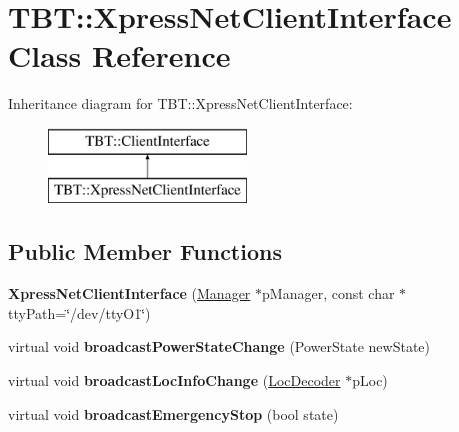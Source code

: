 \hypertarget{classTBT_1_1XpressNetClientInterface}{}\section{T\+BT\+:\+:Xpress\+Net\+Client\+Interface Class Reference}
\label{classTBT_1_1XpressNetClientInterface}
Inheritance diagram for T\+BT\+:\+:Xpress\+Net\+Client\+Interface\+:\begin{figure}[H]
\begin{center}
\leavevmode
\includegraphics[height=2.000000cm]{classTBT_1_1XpressNetClientInterface}
\end{center}
\end{figure}
\subsection*{Public Member Functions}
\begin{DoxyCompactItemize}
\item 
\mbox{\label{classTBT_1_1XpressNetClientInterface_afc3950ffc2b045e653c539a57967aa57}} 
{\bfseries Xpress\+Net\+Client\+Interface} (\hyperlink{classTBT_1_1Manager}{Manager} $\ast$p\+Manager, const char $\ast$tty\+Path=\char`\"{}/dev/tty\+O1\char`\"{})
\item 
\mbox{\label{classTBT_1_1XpressNetClientInterface_a174a6a686771c61ebaf52be9f39fc075}} 
virtual void {\bfseries broadcast\+Power\+State\+Change} (Power\+State new\+State)
\item 
\mbox{\label{classTBT_1_1XpressNetClientInterface_a8e64404cb84913c2d9290d2afb882b39}} 
virtual void {\bfseries broadcast\+Loc\+Info\+Change} (\hyperlink{classTBT_1_1LocDecoder}{Loc\+Decoder} $\ast$p\+Loc)
\item 
\mbox{\label{classTBT_1_1XpressNetClientInterface_a24df895c3771611ff2a47807f2a958ae}} 
virtual void {\bfseries broadcast\+Emergency\+Stop} (bool state)
\end{DoxyCompactItemize}
